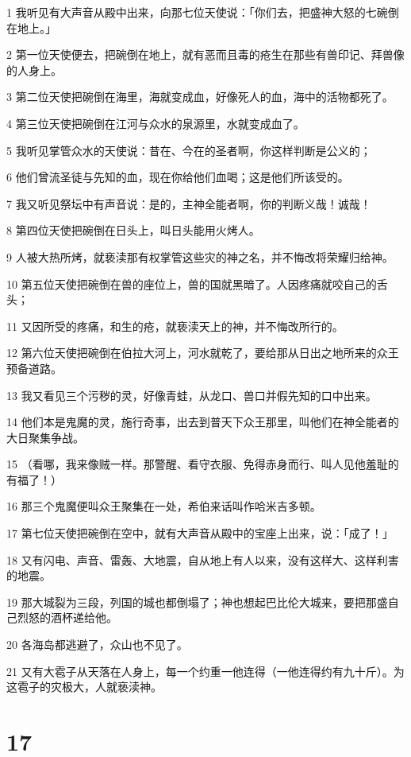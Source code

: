 \par 1 我听见有大声音从殿中出来，向那七位天使说：「你们去，把盛神大怒的七碗倒在地上。」
\par 2 第一位天使便去，把碗倒在地上，就有恶而且毒的疮生在那些有兽印记、拜兽像的人身上。
\par 3 第二位天使把碗倒在海里，海就变成血，好像死人的血，海中的活物都死了。
\par 4 第三位天使把碗倒在江河与众水的泉源里，水就变成血了。
\par 5 我听见掌管众水的天使说：昔在、今在的圣者啊，你这样判断是公义的；
\par 6 他们曾流圣徒与先知的血，现在你给他们血喝；这是他们所该受的。
\par 7 我又听见祭坛中有声音说：是的，主神全能者啊，你的判断义哉！诚哉！
\par 8 第四位天使把碗倒在日头上，叫日头能用火烤人。
\par 9 人被大热所烤，就亵渎那有权掌管这些灾的神之名，并不悔改将荣耀归给神。
\par 10 第五位天使把碗倒在兽的座位上，兽的国就黑暗了。人因疼痛就咬自己的舌头；
\par 11 又因所受的疼痛，和生的疮，就亵渎天上的神，并不悔改所行的。
\par 12 第六位天使把碗倒在伯拉大河上，河水就乾了，要给那从日出之地所来的众王预备道路。
\par 13 我又看见三个污秽的灵，好像青蛙，从龙口、兽口并假先知的口中出来。
\par 14 他们本是鬼魔的灵，施行奇事，出去到普天下众王那里，叫他们在神全能者的大日聚集争战。
\par 15 （看哪，我来像贼一样。那警醒、看守衣服、免得赤身而行、叫人见他羞耻的有福了！）
\par 16 那三个鬼魔便叫众王聚集在一处，希伯来话叫作哈米吉多顿。
\par 17 第七位天使把碗倒在空中，就有大声音从殿中的宝座上出来，说：「成了！」
\par 18 又有闪电、声音、雷轰、大地震，自从地上有人以来，没有这样大、这样利害的地震。
\par 19 那大城裂为三段，列国的城也都倒塌了；神也想起巴比伦大城来，要把那盛自己烈怒的酒杯递给他。
\par 20 各海岛都逃避了，众山也不见了。
\par 21 又有大雹子从天落在人身上，每一个约重一他连得（一他连得约有九十斤）。为这雹子的灾极大，人就亵渎神。

\chapter{17}

